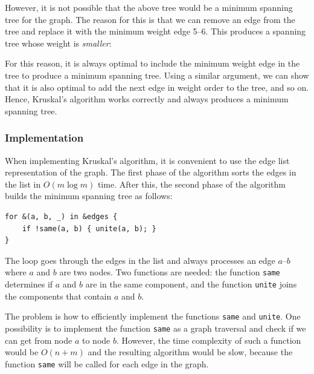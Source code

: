 However, it is not possible that the above tree
would be a minimum spanning tree for the graph.
The reason for this is that we can remove an edge
from the tree and replace it with the minimum weight edge 5--6.
This produces a spanning tree whose weight is
\emph{smaller}:

\begin{center}
\end{center}

For this reason, it is always optimal
to include the minimum weight edge
in the tree to produce a minimum spanning tree.
Using a similar argument, we can show that it
is also optimal to add the next edge in weight order
to the tree, and so on.
Hence, Kruskal's algorithm works correctly and
always produces a minimum spanning tree.

\subsubsection{Implementation}

When implementing Kruskal's algorithm,
it is convenient to use
the edge list representation of the graph.
The first phase of the algorithm sorts the
edges in the list in $O(m \log m)$ time.
After this, the second phase of the algorithm
builds the minimum spanning tree as follows:

\begin{lstlisting}
for &(a, b, _) in &edges {
    if !same(a, b) { unite(a, b); }
}
\end{lstlisting}

The loop goes through the edges in the list
and always processes an edge $a$--$b$
where $a$ and $b$ are two nodes.
Two functions are needed:
the function \texttt{same} determines
if $a$ and $b$ are in the same component,
and the function \texttt{unite}
joins the components that contain $a$ and $b$.

The problem is how to efficiently implement
the functions \texttt{same} and \texttt{unite}.
One possibility is to implement the function
\texttt{same} as a graph traversal and check if
we can get from node $a$ to node $b$.
However, the time complexity of such a function
would be $O(n+m)$
and the resulting algorithm would be slow,
because the function \texttt{same} will be called for each edge in the graph.

